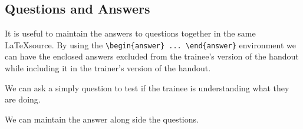 \subsection{Questions and Answers}

It is useful to maintain the answers to questions together in the same \LaTeX source. By using the
\verb+\begin{answer} ... \end{answer}+ environment we can have the enclosed answers excluded from
the trainee's version of the handout while including it in the trainer's version of the handout.

\begin{questions}
We can ask a simply question to test if the trainee is understanding what they are doing.
\begin{answer}
We can maintain the answer along side the questions.
\end{answer}

\end{questions}

%
%
%

